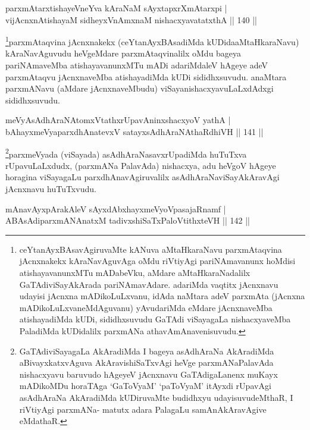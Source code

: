 \begin{shl}
parxmAtarxtishayeVneYva kAraNaM sAyxtapxrXmAtarxpi |\\
vijAcnxnAtishayaM sidheyxVnAmxnaM nishacxyavatatxthA \hfill || 140 ||
\end{shl}

\begin{artha}%
\footnote{ceYtanAyxBAsavAgiruvaMte kANuva aMtaHkaraNavu parxmAtaqvina jAcnxnakekx kAraNavAguvAga oMdu riVtiyAgi pariNAmavanunx hoMdisi atishayavanunxMTu mADabeVku, aMdare aMtaHkaraNadalilx GaTAdiviSayAkArada pariNAmavAdare. adariMda vaqtitx jAcnxnavu udayisi jAcnxna mADikoLuLxvanu, idAda naMtara adeV parxmAta (jAcnxna mADikoLuLxvaneMdAguvanu) yAvudariMda eMdare jAcnxnaveMba atishayadiMda kUDi, sididhxsuvudu GaTAdi viSayagaLa nishacxyaveMba PaladiMda kUDidalilx parxmANa athavA\break mAnavenisuvudu.}parxmAtaqvina jAcnxnakekx (ceYtanAyxBAsadiMda kUDida\break aMtaHkaraNavu) kAraNavAguvudu heVgeMdare parxmAtaqvinalilx oMdu bageya pariNAmaveMba  atishayavanunxMTu mADi adariMdaleV hAgeye adeV parxmAtaqvu jAcnxnaveMba atishayadiMda kUDi sididhxsuvudu. anaMtara parxmANavu (aMdare jAcnxnaveMbudu) viSayanishacxyavuLaLxdAdxgi sididhxsuvudu.
\end{artha}


\begin{shl}
meVyAsAdhAraNAtomxVtathxrUpavAninxshacxyoV yathA |\\
bAhayxmeVyaparxdhAnatevxV satayxsAdhAraNAthaRdhiVH \hfill || 141 ||
\end{shl}

\begin{artha}
\footnote{GaTAdiviSayagaLa AkAradiMda I bageya asAdhAraNa AkAradiMda aBivayxkatxvAguva AkAravishiSaTxvAgi heVge parxmANaPalavAda nishacxyavu baruvudo hAgeyeV jAcnxnavu GaTAdigaLanenx muKayx mADikoMDu horaTAga `GaToV\s yaM' `paToV\s yaM' itAyxdi rUpavAgi asAdhAraNa AkAradiMda kUDiruvaMte budidhxyu udayisuvudeMthaR, I riVtiyAgi parxmANa- matutx adara PalagaLu samAnAkAravAgive eMdathaR.}parxmeVyada (viSayada) asAdhAraNasavxrUpadiMda huTuTxva rUpavuLaLxdudx, (parxmANa PalavAda) nishacxya, adu heVgoV hAgeye horagina viSayagaLu parxdhAnavAgiruvalilx asAdhAraNaviSayAkAravAgi jAcnxnavu huTuTxvudu.
\end{artha}


\begin{shl}
mAnavAyxpArakAleV sAyxdAbxhayxmeVyoVpasajaRnamf |\\
ABAsAdiparxmANAnatxM tadivxshiSaTxPaloVtithxteVH \hfill || 142 ||
\end{shl}

